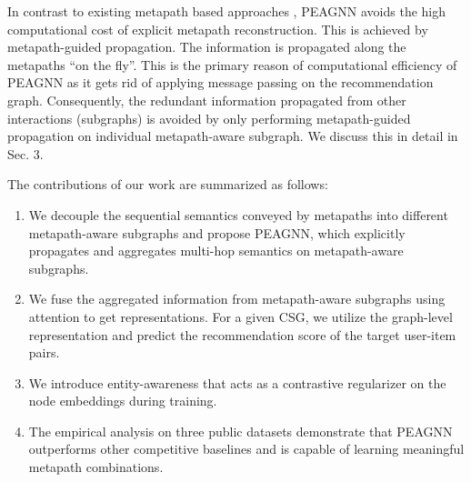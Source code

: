 \documentclass[runningheads, envcountsame, a4paper]{llncs}
\begin{document}
In contrast to existing metapath based approaches \cite{dong2017metapath2vec,fan2019metapath,fu2020magnn,sun2012will,zhang2014meta}, PEAGNN avoids the high computational cost of explicit metapath reconstruction.
This is achieved by metapath-guided propagation. The information is propagated along the metapaths “on the fly”. This is the primary reason of computational efficiency of PEAGNN as it gets rid of applying message passing on the recommendation graph. 
Consequently, the redundant information propagated from other interactions (subgraphs) is avoided by only performing metapath-guided propagation on individual metapath-aware subgraph. We discuss this in detail in Sec. 3.


The contributions of our work are summarized 
as follows:
\begin{enumerate}[noitemsep]
    \item We decouple the sequential semantics conveyed by metapaths into different metapath-aware subgraphs and propose PEAGNN, which explicitly propagates and aggregates multi-hop semantics on metapath-aware subgraphs.
    \item We fuse the aggregated information from metapath-aware subgraphs using attention to get representations. For a given CSG, we utilize the graph-level representation and predict the recommendation score of the target user-item pairs.
    \item We introduce entity-awareness that acts as a contrastive regularizer on the node embeddings during training.
    \item The empirical analysis on three public datasets demonstrate that PEAGNN outperforms other competitive baselines and is capable of learning meaningful metapath combinations.
\end{enumerate}
\end{document}
